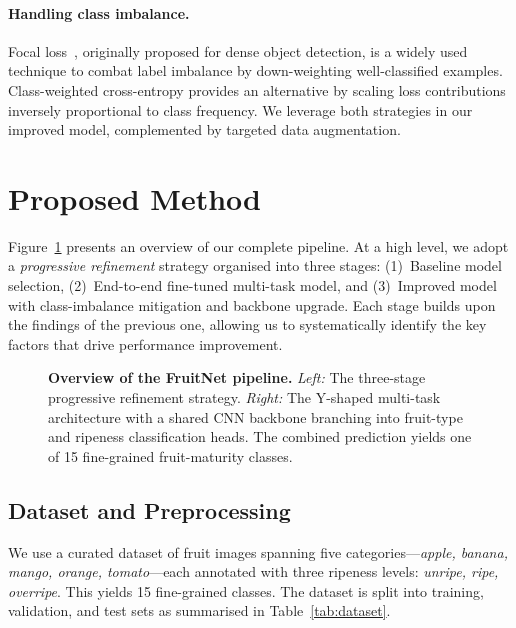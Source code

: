\documentclass[10pt,twocolumn,letterpaper]{article}
\newcommand{\methodname}{FruitNet}
\begin{document}
\paragraph{Handling class imbalance.}
Focal loss~\cite{lin2017focal}, originally proposed for dense object detection, is a widely used technique to combat label imbalance by down-weighting well-classified examples.
Class-weighted cross-entropy provides an alternative by scaling loss contributions inversely proportional to class frequency.
We leverage both strategies in our improved model, complemented by targeted data augmentation.

\section{Proposed Method}
\label{sec:method}

Figure~\ref{fig:overview} presents an overview of our complete pipeline.
At a high level, we adopt a \emph{progressive refinement} strategy organised into three stages:
(1)~Baseline model selection,
(2)~End-to-end fine-tuned multi-task model, and
(3)~Improved model with class-imbalance mitigation and backbone upgrade.
Each stage builds upon the findings of the previous one, allowing us to systematically identify the key factors that drive performance improvement.

\begin{figure}[t]
  \centering
  \resizebox{0.95\textwidth}{!}{}
  \caption{\textbf{Overview of the \methodname{} pipeline.} \textit{Left:} The three-stage progressive refinement strategy. \textit{Right:} The Y-shaped multi-task architecture with a shared CNN backbone branching into fruit-type and ripeness classification heads. The combined prediction yields one of 15 fine-grained fruit-maturity classes.}
  \label{fig:overview}
\end{figure}

\subsection{Dataset and Preprocessing}
\label{sec:dataset}

We use a curated dataset of fruit images spanning five categories---\textit{apple, banana, mango, orange, tomato}---each annotated with three ripeness levels: \textit{unripe, ripe, overripe}.
This yields 15 fine-grained classes.
The dataset is split into training, validation, and test sets as summarised in Table~\ref{tab:dataset}.
\end{document}
